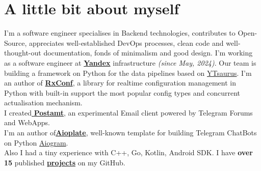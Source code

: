 \documentclass[a4paper,10pt]{article}
\begin{document}
\begin{adjustbox}{valign=t}
\begin{minipage}{0.6\textwidth}
\section*{A little bit about myself}
\begin{description}
\raggedright \normalfont
I'm a software engineer specialises in Backend technologies, contributes to Open-Source, appreciates well-established DevOps processes, clean code and well-thought-out documentation, fonds of minimalism and good design.
\MySkip
I'm working as a software engineer at \href{https://ya.ru}{{\textbf{Yandex}}} infrastructure \textit{(since May, 2024)}. Our team is building a framework on Python for the data pipelines based on \href{https://github.com/ytsaurus/ytsaurus}{YTsaurus}.
\MySkip
I'm an author of \href{https://realkarych.github.io/rxconf/}{\textbf{RxConf}}, a library for realtime configuration management in Python with built-in support the most popular config types and concurrent actualisation mechanism. \\
I created\hspace{0.5em}\href{https://github.com/realkarych/postamt/}{ \textbf{Postamt}}, an experimental Email client powered by Telegram Forums and WebApps. \\
I'm an author of\hspace{0.5em}\href{https://github.com/realkarych/aioplate/}{\faGithub\hspace{0.2em}\textbf{Aioplate}}, well-known template for building Telegram ChatBots on Python \href{https://aiogram.dev/}{Aiogram}. \\
Also I had a tiny experience with C++, Go, Kotlin, Android SDK. I have \textbf{over 15} published \href{https://github.com/realkarych}{\textbf{projects}} on my GitHub. \\

\end{description}


\end{minipage}
\end{adjustbox}
\end{document}

